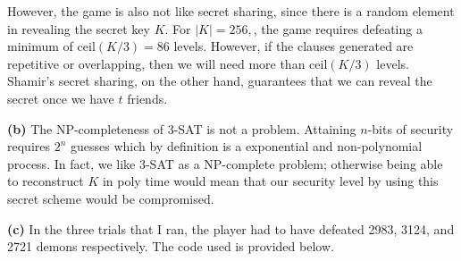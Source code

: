 \documentclass[11pt]{article}
\begin{document}
However, the game is also not like secret sharing, since there is a random element in revealing the secret key $K$. For $|K| = 256, $, the game requires defeating a minimum of ceil$(K/3) = 86$ levels. However, if the clauses generated are repetitive or overlapping, then we will need more than ceil$(K/3)$ levels. Shamir's secret sharing, on the other hand, guarantees that we can reveal the secret once we have $t$ friends. 

\textbf{(b)} The NP-completeness of 3-SAT is not a problem. Attaining $n$-bits of security requires $2^n$ guesses which by definition is a exponential and non-polynomial process. In fact, we like 3-SAT as a NP-complete problem; otherwise being able to reconstruct $K$ in poly time would mean that our security level by using this secret scheme would be compromised.

\textbf{(c)} 
In the three trials that I ran, the player had to have defeated 2983, 3124, and 2721 demons respectively. The code used is provided below.
\end{document}

